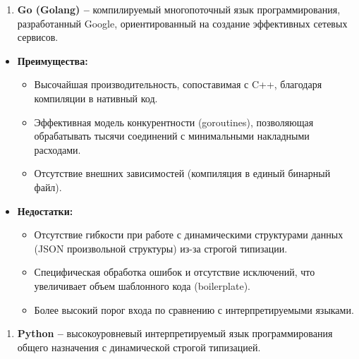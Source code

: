 \documentclass[
]{article}
\begin{document}
\begin{enumerate}
\def\labelenumi{\arabic{enumi}.}
\setcounter{enumi}{1}
\item
  \textbf{Go (Golang) --} компилируемый многопоточный язык
  программирования, разработанный Google, ориентированный на создание
  эффективных сетевых сервисов.
\end{enumerate}

\begin{itemize}
\item
  \textbf{Преимущества:}

  \begin{itemize}
  \item
    Высочайшая производительность, сопоставимая с C++, благодаря
    компиляции в нативный код.
  \item
    Эффективная модель конкурентности (goroutines), позволяющая
    обрабатывать тысячи соединений с минимальными накладными расходами.
  \item
    Отсутствие внешних зависимостей (компиляция в единый бинарный файл).
  \end{itemize}
\item
  \textbf{Недостатки:}

  \begin{itemize}
  \item
    Отсутствие гибкости при работе с динамическими структурами данных
    (JSON произвольной структуры) из-за строгой типизации.
  \item
    Специфическая обработка ошибок и отсутствие исключений, что
    увеличивает объем шаблонного кода (boilerplate).
  \item
    Более высокий порог входа по сравнению с интерпретируемыми языками.
  \end{itemize}
\end{itemize}

\begin{enumerate}
\def\labelenumi{\arabic{enumi}.}
\setcounter{enumi}{2}
\item
  \textbf{Python --} высокоуровневый интерпретируемый язык
  программирования общего назначения с динамической строгой типизацией.
\end{enumerate}
\end{document}
